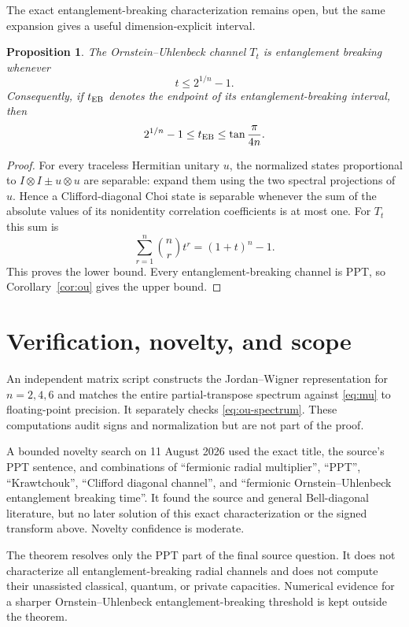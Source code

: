 \documentclass[11pt]{article}
\newtheorem{proposition}[theorem]{Proposition}
\begin{document}
The exact entanglement-breaking characterization remains open, but the same
expansion gives a useful dimension-explicit interval.

\begin{proposition}
The Ornstein--Uhlenbeck channel $T_t$ is entanglement breaking whenever
\[
 t\le 2^{1/n}-1.
\]
Consequently, if $t_{\rm EB}$ denotes the endpoint of its
entanglement-breaking interval, then
\[
 2^{1/n}-1\le t_{\rm EB}\le\tan\frac{\pi}{4n}.
\]
\end{proposition}

\begin{proof}
For every traceless Hermitian unitary $u$, the normalized states proportional
to $I\otimes I\pm u\otimes u$ are separable: expand them using the two spectral
projections of $u$.  Hence a Clifford-diagonal Choi state is separable whenever
the sum of the absolute values of its nonidentity correlation coefficients is
at most one.  For $T_t$ this sum is
\[
 \sum_{r=1}^n\binom nr t^r=(1+t)^n-1.
\]
This proves the lower bound.  Every entanglement-breaking channel is PPT, so
Corollary~\ref{cor:ou} gives the upper bound.
\end{proof}

\section{Verification, novelty, and scope}

An independent matrix script constructs the Jordan--Wigner representation for
$n=2,4,6$ and matches the entire partial-transpose spectrum against
\eqref{eq:mu} to floating-point precision.  It separately checks
\eqref{eq:ou-spectrum}.  These computations audit signs and normalization but
are not part of the proof.

A bounded novelty search on 11 August 2026 used the exact title, the source's
PPT sentence, and combinations of ``fermionic radial multiplier'', ``PPT'',
``Krawtchouk'', ``Clifford diagonal channel'', and ``fermionic
Ornstein--Uhlenbeck entanglement breaking time''.  It found the source and
general Bell-diagonal literature, but no later solution of this exact
characterization or the signed transform above.  Novelty confidence is
moderate.

The theorem resolves only the PPT part of the final source question.  It does
not characterize all entanglement-breaking radial channels and does not
compute their unassisted classical, quantum, or private capacities.  Numerical
evidence for a sharper Ornstein--Uhlenbeck entanglement-breaking threshold is
kept outside the theorem.
\end{document}

